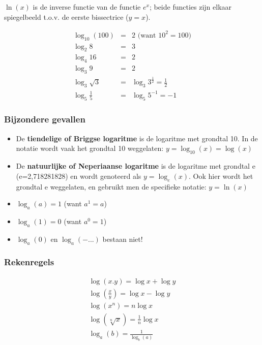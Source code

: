 $\ln(x)$ is de inverse functie van de functie
$e^{x}$; beide functies zijn elkaar spiegelbeeld
t.o.v. de eerste bissectrice ($y=x$).



\begin{voorbeeld}
	\begin{eqnarray*}
\log_{10}\left(100\right)&=&2 \text{ (want $10^{2}=100$)}\\
\log_{2}8&=&3\\
\log_{4}16&=&2\\
\log_{3}9&=&2\\
\log_{3}\sqrt{3}&=&\log_{3}3^{\frac{1}{2}}=\frac{1}{2}\\
\log_{5}\frac{1}{5}&=&\log_{5}5^{-1}=-1
	\end{eqnarray*}
\end{voorbeeld}


\subsubsection{Bijzondere gevallen}
\begin{itemize}
\item De \textbf{tiendelige of Briggse logaritme} is de logaritme met grondtal
10. In de notatie wordt vaak het grondtal 10 weggelaten: $y=\log_{10}\left(x\right)=\log\left(x\right)$
\item De \textbf{natuurlijke of Neperiaanse logaritme} is de logaritme met
grondtal e (e=2,718281828) en wordt genoteerd als $y=\log_{e}(x)$. Ook hier wordt het grondtal e weggelaten, en gebruikt men de specifieke
notatie: $y=\ln(x)$
\item $\log_{a}\left(a\right)=1$ (want $a^{1}=a$)
\item $\log_{a}\left(1\right)=0$ (want $a^{0}=1$)
\item $\log_{a}\left(0\right)$ en $\log_{a}\left(-...\right)$
bestaan niet!
\end{itemize}

\subsubsection{Rekenregels}

\begin{ftrekenregel}
\begin{eqnarray}
\log\left(x.y\right)=\log x+\log y\\
\log\left(\frac{x}{y}\right)=\log x-\log y\\
\log\left(x^{n}\right)=n\log x\\
\log\left(\sqrt[n]{x}\right)=\frac{1}{n}\log x\\
\log_{a}\left(b\right)=\frac{1}{\log_{b}\left(a\right)}\\
\end{eqnarray}
\end{ftrekenregel}


